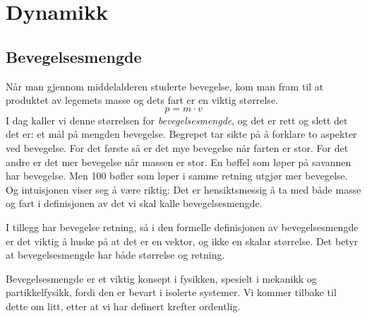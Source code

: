 \chapter{Dynamikk}
\label{Chapter:dynamikk}
\section{Bevegelsesmengde}
Når man gjennom middelalderen studerte bevegelse, kom man fram til at produktet av legemets masse og dets fart er en viktig størrelse.
\[p = m \cdot v\]
I dag kaller vi denne størrelsen for \textit{bevegelsesmengde}, og det er rett og slett det det er: et mål på mengden bevegelse. Begrepet tar sikte på å forklare to aspekter ved bevegelse. For det første så er det mye bevegelse når farten er stor. For det andre er det mer bevegelse når massen er stor. En bøffel som løper på savannen har bevegelse. Men 100 bøfler som løper i samme retning utgjør mer bevegelse. Og intuisjonen viser seg å være riktig: Det er hensiktsmessig å ta med både masse og fart i definisjonen av det vi skal kalle bevegelsesmengde.

I tillegg har bevegelse retning, så i den formelle definisjonen av bevegelsesmengde er det viktig å huske på at det er en vektor, og ikke en skalar størrelse. Det betyr at bevegelsesmengde har både størrelse og retning.

Bevegelsesmengde er et viktig konsept i fysikken, spesielt i mekanikk og partikkelfysikk, fordi den er bevart i isolerte systemer. Vi kommer tilbake til dette om litt, etter at vi har definert krefter ordentlig.



